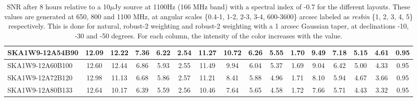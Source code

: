 \begin{table}[H]
{{\begin{tabular}{|lccccc||ccccc||ccccc|}
SKA1W9-12A54B90 & 12.09 \cellcolor{blue!49.65} & 12.22 \cellcolor{red!58.04} & 7.36 \cellcolor{green!60.00} & 6.22 \cellcolor{orange!60.00} & 2.54 \cellcolor{purple!18.00} & 11.27 \cellcolor{blue!57.23} & 10.72 \cellcolor{red!60.00} & 6.26 \cellcolor{green!60.00} & 5.55 \cellcolor{orange!60.00} & 1.70 \cellcolor{purple!22.20} & 9.49 \cellcolor{blue!60.00} & 7.18 \cellcolor{red!60.00} & 5.15 \cellcolor{green!60.00} & 4.61 \cellcolor{orange!60.00} & 0.95 \cellcolor{purple!18.00}\\ \hline 
SKA1W9-12A60B100 & 12.60 \cellcolor{blue!55.58} & 12.44 \cellcolor{red!60.00} & 6.86 \cellcolor{green!45.62} & 5.93 \cellcolor{orange!41.82} & 2.55 \cellcolor{purple!21.82} & 11.49 \cellcolor{blue!60.00} & 9.94 \cellcolor{red!52.05} & 6.04 \cellcolor{green!50.17} & 5.37 \cellcolor{orange!52.21} & 1.69 \cellcolor{purple!18.00} & 9.04 \cellcolor{blue!53.72} & 6.42 \cellcolor{red!42.93} & 5.00 \cellcolor{green!51.25} & 4.33 \cellcolor{orange!50.88} & 0.95 \cellcolor{purple!18.00}\\ \hline 
SKA1W9-12A72B120 & 12.98 \cellcolor{blue!60.00} & 11.13 \cellcolor{red!48.34} & 6.68 \cellcolor{green!40.44} & 5.86 \cellcolor{orange!37.43} & 2.57 \cellcolor{purple!29.45} & 11.21 \cellcolor{blue!56.48} & 8.41 \cellcolor{red!36.45} & 5.88 \cellcolor{green!43.02} & 4.96 \cellcolor{orange!34.45} & 1.71 \cellcolor{purple!26.40} & 8.10 \cellcolor{blue!40.60} & 5.94 \cellcolor{red!32.15} & 4.67 \cellcolor{green!32.00} & 3.66 \cellcolor{orange!29.07} & 0.95 \cellcolor{purple!18.00}\\ \hline 
SKA1W9-12A80B133 & 12.64 \cellcolor{blue!56.04} & 10.17 \cellcolor{red!39.80} & 6.39 \cellcolor{green!32.10} & 5.59 \cellcolor{orange!20.51} & 2.56 \cellcolor{purple!25.64} & 10.46 \cellcolor{blue!47.05} & 7.64 \cellcolor{red!28.60} & 5.65 \cellcolor{green!32.74} & 4.58 \cellcolor{orange!18.00} & 1.72 \cellcolor{purple!30.60} & 7.66 \cellcolor{blue!34.47} & 5.71 \cellcolor{red!26.98} & 4.43 \cellcolor{green!18.00} & 3.32 \cellcolor{orange!18.00} & 0.95 \cellcolor{purple!18.00}\\ \hline 
\end{tabular}}
\vspace{-0.300000cm}
\hspace{1cm} 

\vspace{.50cm}
\caption{SNR after 8 hours relative to a 10$\mu$Jy source at 1100Hz (166 MHz band) with a spectral index of -0.7 for the different layouts. These values are generated at 650, 800 and 1100 MHz, at angular scales \{0.4-1, 1-2, 2-3, 3-4, 600-3600\} arcsec labeled as {\it resbin} \{1, 2, 3, 4, 5\} respectively. This is done for natural, robust-2 weighting and robust-2 weighting with a 1 arcsec Gaussian taper, at declinations -10, -30 and -50 degrees. For each column, the intensity of the color increases with the value.}\label{tab:snr10}}
 \end{table}
